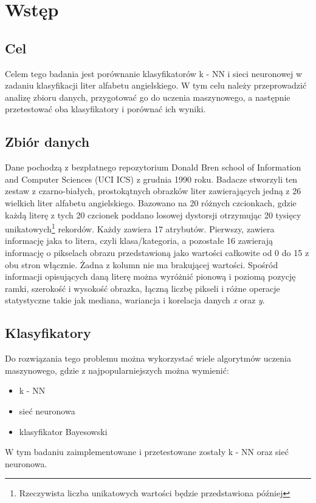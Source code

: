 \section{Wstęp}\label{sec:wstep}

\subsection{Cel}\label{subsec:cel}
Celem tego badania jest porównanie klasyfikatorów k - NN i sieci neuronowej w zadaniu klasyfikacji liter alfabetu angielskiego.
W tym celu należy przeprowadzić analizę zbioru danych, przygotować go do uczenia maszynowego, a następnie przetestować oba klasyfikatory i porównać ich wyniki.

\subsection{Zbiór danych}\label{subsec:zbiordanych}
Dane pochodzą z bezpłatnego repozytorium Donald Bren school of Information and Computer Sciences \cite{misc_letter_recognition_59} (UCI ICS) z grudnia 1990 roku.
Badacze stworzyli ten zestaw z czarno-białych, prostokątnych obrazków liter zawierających jedną z 26 wielkich liter alfabetu angielskiego.
Bazowano na 20 różnych czcionkach, gdzie każdą literę z tych 20 czcionek poddano losowej dystorsji otrzymując 20 tysięcy 
unikatowych\footnote{Rzeczywista liczba unikatowych wartości będzie przedstawiona później} rekordów.
Każdy zawiera 17 atrybutów. Pierwszy, zawiera informację jaka to litera, czyli klasa/kategoria, 
a pozostałe 16 zawierają informację o pikselach obrazu przedstawioną jako wartości całkowite od 0 do 15 z obu stron włącznie.
Żadna z kolumn nie ma brakującej wartości. Spośród informacji opisujących daną literę można wyróżnić pionową i poziomą pozycję ramki, 
szerokość i wysokość obrazka, łączną liczbę pikseli i różne operacje statystyczne
takie jak mediana, wariancja i korelacja danych \textit{x} oraz \textit{y}.

\subsection{Klasyfikatory}\label{subsec:klasyfikatory}
Do rozwiązania tego problemu można wykorzystać wiele algorytmów uczenia maszynowego, gdzie z najpopularniejszych można wymienić:
\begin{itemize}
    \item k - NN
    \item sieć neuronowa
    \item klasyfikator Bayesowski
\end{itemize}
W tym badaniu zaimplementowane i przetestowane zostały k - NN oraz sieć neuronowa.

